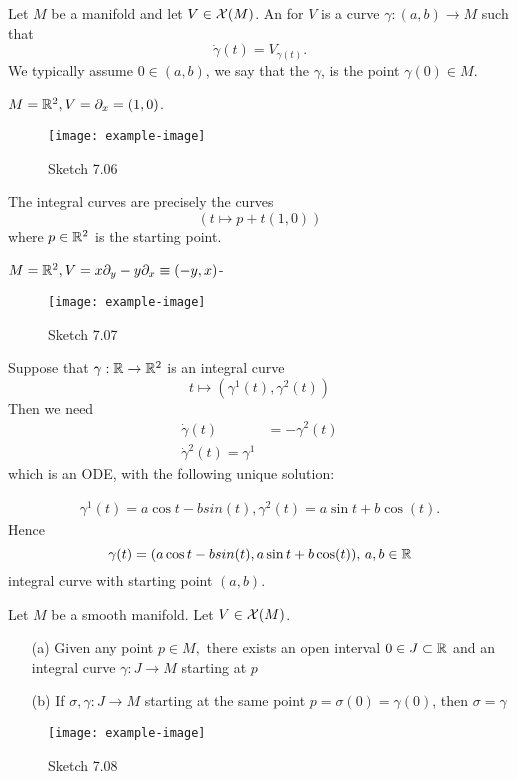 \begin{definition*}
    Let \(M\) be a manifold and let \(V\in \mathcal{X}(M)\). An  for \(V\) is a curve 
    \(\gamma:(a,b)\to M\) such that 
    \[\dot{\gamma}(t)=V_{\gamma(t)}.\]   
    We typically assume \(0\in (a,b)\), we say that the  \(\gamma\), is the point \(\gamma(0)\in M\).
\end{definition*}

\begin{example}
    \(M=\mathbb{R}^2,V=\partial_x=(1,0)\).
    \begin{figure}[H]\label{fig:7.06}
        \centering
        \texttt{[image: example-image]}
        \caption{Sketch 7.06}
    \end{figure}
    The integral curves are precisely the curves 
    \[(t\mapsto p+t(1,0))\]
    where \(p\in \mathbb{R}^2\) is the starting point.
\end{example}

\begin{example}
    \(M=\mathbb{R}^2,V=x\partial_y-y\partial_x\equiv (-y,x)\)-
    \begin{figure}[H]\label{fig:7.07}
        \centering
        \texttt{[image: example-image]}
        \caption{Sketch 7.07}
    \end{figure}

    Suppose that \(\gamma:\mathbb{R}\to \mathbb{R}^2\) is an integral curve
    \[t\mapsto (\gamma^1(t),\gamma^2(t))\]
    Then we need \begin{align*}
        \dot{\gamma}(t)&=-\gamma^2(t)\\
        \dot{\gamma}^2(t) = \gamma^1
    \end{align*}
    which is an ODE, with the following unique solution: 
    
    \begin{align*}
        \gamma^1(t)=a\cos t-b sin (t), 
        \gamma^2(t)=a \sin t + b\cos(t).
    \end{align*}
    Hence \[\gamma(t)=(a\cos t-b sin (t),a \sin t + b\cos(t))\text{, }a,b\in \mathbb{R}\]
    integral curve with starting point \((a,b)\).
\end{example}
\begin{proposition}\label{prop:7.9}
    Let \(M\) be a smooth manifold. Let \(V\in \mathcal{X}(M)\).
    \begin{enumerate}
        \item[(a)]  Given any point \(p\in M,\) there exists an open interval \(0\in J\subset \mathbb{R}\) and 
                   an integral curve \(\gamma:J\to M\) starting at \(p\)
        \item[(b)]  If \(\sigma,\gamma:J\to M\) starting at the same point \(p=\sigma(0)=\gamma(0)\), then \(\sigma=\gamma\)
    \end{enumerate}
    \begin{figure}[H]\label{fig:7.08}
        \centering
        \texttt{[image: example-image]}
        \caption{Sketch 7.08}
    \end{figure}
\end{proposition}

